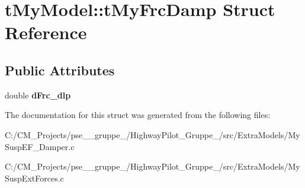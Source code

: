 \hypertarget{structt_my_model_1_1t_my_frc_damp}{}\section{t\+My\+Model\+::t\+My\+Frc\+Damp Struct Reference}
\label{structt_my_model_1_1t_my_frc_damp}
\subsection*{Public Attributes}
\begin{DoxyCompactItemize}
\item 
\mbox{\label{structt_my_model_1_1t_my_frc_damp_a0010d5b10e6b9469bf28b197517fe1c6}} 
double {\bfseries d\+Frc\+\_\+dlp}
\end{DoxyCompactItemize}


The documentation for this struct was generated from the following files\+:\begin{DoxyCompactItemize}
\item 
C\+:/\+C\+M\+\_\+\+Projects/pse\+\_\+\_\+gruppe\+\_/\+Highway\+Pilot\+\_\+\+Gruppe\+\_/src/\+Extra\+Models/My\+Susp\+E\+F\+\_\+\+Damper.\+c\item 
C\+:/\+C\+M\+\_\+\+Projects/pse\+\_\+\_\+gruppe\+\_/\+Highway\+Pilot\+\_\+\+Gruppe\+\_/src/\+Extra\+Models/My\+Susp\+Ext\+Forces.\+c\end{DoxyCompactItemize}
